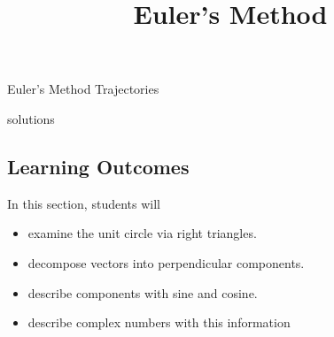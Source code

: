 \documentclass{ximera}
\title{Euler's Method}
\begin{document}
\begin{abstract}
\end{abstract}
\maketitle


Euler's Method
Trajectories

solutions





\subsection{Learning Outcomes}


\begin{sectionOutcomes}
In this section, students will 

\begin{itemize}
\item examine the unit circle via right triangles.
\item decompose vectors into perpendicular components.
\item describe components with sine and cosine.
\item describe complex numbers with this information
\end{itemize}
\end{sectionOutcomes}
\end{document}
